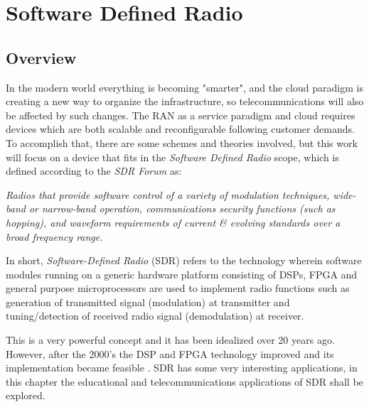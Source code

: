 \chapter{Software Defined Radio}
\label{chap:sdr}

\section{Overview}%
\label{sdr:overview}

In the modern world everything is becoming "smarter", and the cloud paradigm is
creating a new way to organize the infrastructure, so telecommunications will
also be affected by such changes. The RAN as a service  paradigm and cloud
requires devices which are both scalable and reconfigurable following customer
demands. To accomplish that, there are some schemes and theories
involved, but this work will focus on a device that fits in the \emph{Software
Defined Radio} scope, which is defined according to the \emph{SDR Forum}
\cite{web:sdrforum} as:\\

\begin{displayquote}
\textit{Radios that provide software control of a variety of modulation techniques,
wide-band or narrow-band operation, communications security functions (such as
hopping), and waveform requirements of current \& evolving standards over a
broad frequency range.}\\
\end{displayquote}

In short, \textit{Software-Defined Radio} (SDR) refers to the technology wherein
software modules running on a generic hardware platform consisting of DSPs, FPGA
and general purpose microprocessors are used to implement radio functions such
as generation of transmitted signal (modulation) at transmitter and
tuning/detection of received radio signal (demodulation) at receiver.

This is a very powerful concept and it has been idealized over 20 years ago.
However, after the 2000's the DSP and FPGA technology improved and its
implementation became feasible \cite{ladimer2009}. SDR has some very interesting
applications, in this chapter the educational and telecommunications
applications of SDR shall be explored.

